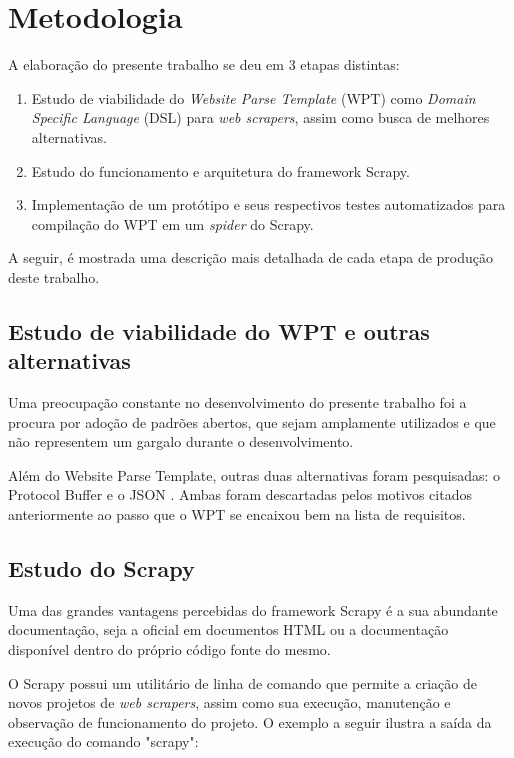 \chapter{Metodologia}

A elaboração do presente trabalho se deu em 3 etapas distintas:

\begin{enumerate}
	\item Estudo de viabilidade do \emph{Website Parse Template} (WPT) como \emph{Domain Specific Language} (DSL) para \emph{web scrapers}, assim como busca de melhores alternativas.
	\item Estudo do funcionamento e arquitetura do framework Scrapy.
	\item Implementação de um protótipo e seus respectivos testes automatizados para compilação do WPT em um \emph{spider} do Scrapy.
\end{enumerate}

A seguir, é mostrada uma descrição mais detalhada de cada etapa de produção deste trabalho.

\section{Estudo de viabilidade do WPT e outras alternativas}

Uma preocupação constante no desenvolvimento do presente trabalho foi a procura por adoção de padrões abertos, que sejam amplamente utilizados e que não representem um gargalo durante o desenvolvimento.

Além do Website Parse Template, outras duas alternativas foram pesquisadas: o Protocol Buffer \cite{protobuf} e o JSON \cite{JSON}. Ambas foram descartadas pelos motivos citados anteriormente ao passo que o WPT se encaixou bem na lista de requisitos.

\section{Estudo do Scrapy}

Uma das grandes vantagens percebidas do framework Scrapy é a sua abundante documentação, seja a oficial em documentos HTML ou a documentação disponível dentro do próprio código fonte do mesmo.

O Scrapy possui um utilitário de linha de comando que permite a criação de novos projetos de \emph{web scrapers}, assim como sua execução, manutenção e observação de funcionamento do projeto. O exemplo a seguir ilustra a saída da execução do comando "scrapy":


